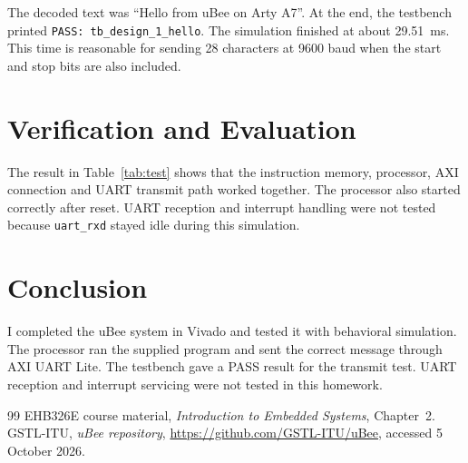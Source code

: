 \documentclass[12pt,a4paper]{article}
\begin{document}
The decoded text was ``Hello from uBee on Arty A7''. At the end, the testbench
printed \texttt{PASS: tb\_design\_1\_hello}. The simulation finished at about
29.51~ms. This time is reasonable for sending 28 characters at 9600 baud when
the start and stop bits are also included.

\section{Verification and Evaluation}
The result in Table~\ref{tab:test} shows that the instruction memory, processor,
AXI connection and UART transmit path worked together. The processor also
started correctly after reset. UART reception and interrupt handling were not
tested because \texttt{uart\_rxd} stayed idle during this simulation.

\section{Conclusion}
I completed the uBee system in Vivado and tested it with behavioral simulation.
The processor ran the supplied program and sent the correct message through
AXI UART Lite. The testbench gave a PASS result for the transmit test. UART
reception and interrupt servicing were not tested in this homework.

\begin{thebibliography}{99}
 EHB326E course material, \emph{Introduction to
Embedded Systems}, Chapter~2.
 GSTL-ITU, \emph{uBee repository},
\url{https://github.com/GSTL-ITU/uBee}, accessed 5 October 2026.
\end{thebibliography}
\end{document}
